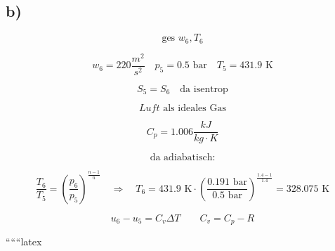 

\subsection*{b)}

\[
\text{ges } w_6, T_6
\]

\[
w_6 = 220 \frac{m^2}{s^2} \quad p_5 = 0.5 \text{ bar} \quad T_5 = 431.9 \text{ K}
\]

\[
S_5 = S_6 \quad \text{da isentrop}
\]

\[
Luft \text{ als ideales Gas}
\]

\[
C_p = 1.006 \frac{kJ}{kg \cdot K}
\]

\[
\text{da adiabatisch:}
\]

\[
\frac{T_6}{T_5} = \left( \frac{p_6}{p_5} \right)^{\frac{n-1}{n}} \quad \Rightarrow \quad T_6 = 431.9 \text{ K} \cdot \left( \frac{0.191 \text{ bar}}{0.5 \text{ bar}} \right)^{\frac{1.4-1}{1.4}} = 328.075 \text{ K}
\]

\[
u_6 - u_5 = C_v \Delta T \quad \quad C_v = C_p - R
\]

``````latex